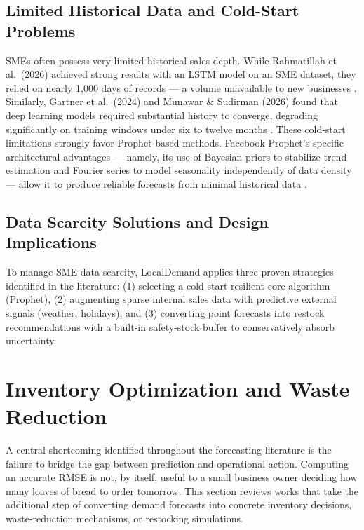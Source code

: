 \documentclass[conference]{IEEEtran}
\begin{document}
\subsection{Limited Historical Data and Cold-Start Problems}

SMEs often possess very limited historical sales depth. While Rahmatillah 
et al.\ (2026) achieved strong results with an LSTM model on an SME dataset, 
they relied on nearly 1{,}000 days of records --- a volume unavailable to new 
businesses \cite{rahmatillah2026}. Similarly, Gartner et al.\ (2024) and 
Munawar \& Sudirman (2026) found that deep learning models required substantial 
history to converge, degrading significantly on training windows under six to 
twelve months \cite{gartner2024, munawar2026}. These cold-start limitations 
strongly favor Prophet-based methods. Facebook Prophet's specific architectural 
advantages --- namely, its use of Bayesian priors to stabilize trend estimation 
and Fourier series to model seasonality independently of data density --- allow 
it to produce reliable forecasts from minimal historical data \cite{susanto2026}.

\subsection{Data Scarcity Solutions and Design Implications}

To manage SME data scarcity, LocalDemand applies three proven strategies 
identified in the literature: (1) selecting a cold-start resilient core 
algorithm (Prophet), (2) augmenting sparse internal sales data with 
predictive external signals (weather, holidays), and (3) converting point 
forecasts into restock recommendations with a built-in safety-stock buffer 
to conservatively absorb uncertainty.

\section{Inventory Optimization and Waste Reduction}

A central shortcoming identified throughout the forecasting literature is
the failure to bridge the gap between prediction and operational action.
Computing an accurate RMSE is not, by itself, useful to a small business
owner deciding how many loaves of bread to order tomorrow. This section
reviews works that take the additional step of converting demand forecasts
into concrete inventory decisions, waste-reduction mechanisms, or
restocking simulations.
\end{document}
